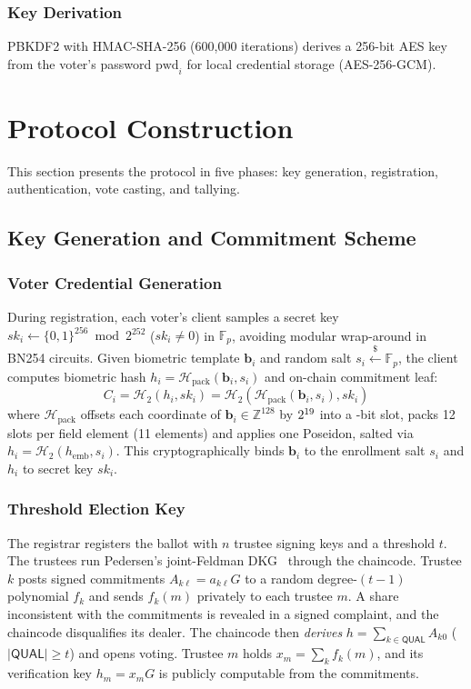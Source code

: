 \documentclass[10pt,letterpaper,journal]{IEEEtran}
\begin{document}
\subsubsection{Key Derivation}
PBKDF2 with HMAC-SHA-256 (600,000 iterations) derives a 256-bit AES key from the voter's password $\text{pwd}_i$ for local credential storage (AES-256-GCM).



\section{Protocol Construction}
\label{sec:protocol_construction}

This section presents the protocol in five phases: key generation, registration, authentication, vote casting, and tallying.

\subsection{Key Generation and Commitment Scheme}

\subsubsection{Voter Credential Generation}
During registration, each voter's client samples a secret key $sk_i \leftarrow \{0,1\}^{256} \bmod 2^{252}$ ($sk_i \neq 0$) in $\mathbb{F}_p$, avoiding modular wrap-around in BN254 circuits. Given biometric template $\mathbf{b}_i$ and random salt $s_i \xleftarrow{\$} \mathbb{F}_p$, the client computes biometric hash $h_i = \mathcal{H}_{\text{pack}}(\mathbf{b}_i, s_i)$ and on-chain commitment leaf:
\begin{equation}
\label{eq:commitment-leaf}
C_i = \mathcal{H}_2(h_i, sk_i) = \mathcal{H}_2(\mathcal{H}_{\text{pack}}(\mathbf{b}_i, s_i), sk_i)
\end{equation}
where $\mathcal{H}_{\text{pack}}$ offsets each coordinate of $\mathbf{b}_i \in \mathbb{Z}^{128}$ by $2^{19}$ into a \nRangePerCoord-bit slot, packs 12 slots per field element (11 elements) and applies one Poseidon, salted via $h_i = \mathcal{H}_2(h_{\text{emb}}, s_i)$. This cryptographically binds $\mathbf{b}_i$ to the enrollment salt $s_i$ and $h_i$ to secret key $sk_i$.

\subsubsection{Threshold Election Key}
The registrar registers the ballot with $n$ trustee signing keys and a threshold $t$. The trustees run Pedersen's joint-Feldman DKG~\cite{Pedersen1991,Feldman1987} through the chaincode. Trustee $k$ posts signed commitments $A_{k\ell} = a_{k\ell} G$ to a random degree-$(t-1)$ polynomial $f_k$ and sends $f_k(m)$ privately to each trustee $m$. A share inconsistent with the commitments is revealed in a signed complaint, and the chaincode disqualifies its dealer. The chaincode then \emph{derives} $h = \sum_{k \in \mathsf{QUAL}} A_{k0}$ ($|\mathsf{QUAL}| \ge t$) and opens voting. Trustee $m$ holds $x_m = \sum_k f_k(m)$, and its verification key $h_m = x_m G$ is publicly computable from the commitments.
\end{document}
